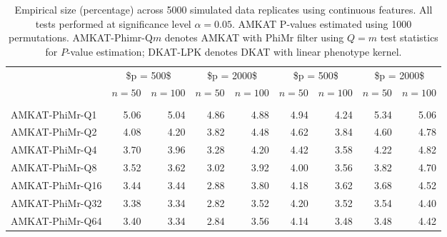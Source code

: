 \documentclass[a4paper,oneside,10pt]{article}\usepackage[]{graphicx}\usepackage[]{color}
\makeatletter
\newenvironment{kframe}{%
 \def\at@end@of@kframe{}%
 \ifinner\ifhmode%
  \def\at@end@of@kframe{\end{minipage}}%
  \begin{minipage}{\columnwidth}%
 \fi\fi%
 \def\FrameCommand##1{\hskip\@totalleftmargin \hskip-\fboxsep
 \colorbox{shadecolor}{##1}\hskip-\fboxsep
     \hskip-\linewidth \hskip-\@totalleftmargin \hskip\columnwidth}%
 \MakeFramed {\advance\hsize-\width
   \@totalleftmargin\z@ \linewidth\hsize
   \@setminipage}}%
 {\par\unskip\endMakeFramed%
 \at@end@of@kframe}
\newenvironment{knitrout}{}{} %
\makeatother
\begin{document}
\begin{knitrout}
\color{fgcolor}\begin{kframe}


{\ttfamily\noindent\bfseries{}}\end{kframe}\begin{table}

\caption{\label{tab:size_snp}Empirical size (percentage) across 5000 simulated data replicates  using continuous features. All tests performed at significance level $\alpha = 0.05$. AMKAT P-values estimated using 1000 permutations. AMKAT-Phimr-Q$m$ denotes AMKAT with PhiMr filter using $Q=m$ test statistics for $P$-value estimation; DKAT-LPK denotes DKAT with linear phenotype kernel.}
\centering
\begin{tabular}[t]{lrrrrrrrr}
\toprule
\multicolumn{1}{c}{ } & \multicolumn{2}{c}{\$p = 500\$} & \multicolumn{2}{c}{\$p = 2000\$} & \multicolumn{2}{c}{\$p = 500\$} & \multicolumn{2}{c}{\$p = 2000\$} \\
\cmidrule(l{3pt}r{3pt}){2-3} \cmidrule(l{3pt}r{3pt}){4-5} \cmidrule(l{3pt}r{3pt}){6-7} \cmidrule(l{3pt}r{3pt}){8-9}
  & $n = 50$ & $n = 100$ & $n = 50$ & $n = 100$ & $n = 50$ & $n = 100$ & $n = 50$ & $n = 100$\\
\midrule
\addlinespace[0.3em]
\multicolumn{9}{l}{\textbf{Multivariate normal errors}}\\
\hspace{1em}AMKAT-PhiMr-Q1 & 5.06 & 5.04 & 4.86 & 4.88 & 4.94 & 4.24 & 5.34 & 5.06\\
\hspace{1em}AMKAT-PhiMr-Q2 & 4.08 & 4.20 & 3.82 & 4.48 & 4.62 & 3.84 & 4.60 & 4.78\\
\hspace{1em}AMKAT-PhiMr-Q4 & 3.70 & 3.96 & 3.28 & 4.20 & 4.42 & 3.58 & 4.22 & 4.82\\
\hspace{1em}AMKAT-PhiMr-Q8 & 3.52 & 3.62 & 3.02 & 3.92 & 4.00 & 3.56 & 3.82 & 4.70\\
\hspace{1em}AMKAT-PhiMr-Q16 & 3.44 & 3.44 & 2.88 & 3.80 & 4.18 & 3.62 & 3.68 & 4.52\\
\hspace{1em}AMKAT-PhiMr-Q32 & 3.38 & 3.34 & 2.82 & 3.52 & 4.20 & 3.52 & 3.54 & 4.40\\
\hspace{1em}AMKAT-PhiMr-Q64 & 3.40 & 3.34 & 2.84 & 3.56 & 4.14 & 3.48 & 3.48 & 4.42\\

\end{tabular}
\end{table}
\end{knitrout}
\end{document}

